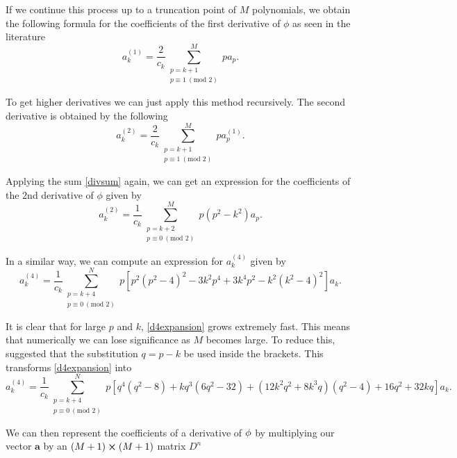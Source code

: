 If we continue this process up to a truncation point of $ M $ polynomials, we obtain the following formula for the coefficients of the first derivative of $ \phi $ as seen in the literature \citep{canuto2007spectral, orszag1971accurate} 
\begin{equation}
    a_k^{(1)} = \frac{2}{c_k} \sum^{M}_{\substack{p = k + 1 \\ p \equiv 1\ (\text{mod } 2)}} p a_p. \label{divsum}
\end{equation}

To get higher derivatives we can just apply this method recursively. The second derivative is obtained by the following 
\begin{equation}
    a_k^{(2)} = \frac{2}{c_k} \sum^{M}_{\substack{p = k + 1 \\ p \equiv 1\ (\text{mod } 2)}} p a_p^{(1)}.
\end{equation}

Applying the sum \eqref{divsum} again, we can get an expression for the coefficients of the $2$nd derivative of $ \phi$ given by
\begin{equation}
    a^{(2)}_{k} = \frac{1}{c_k} \sum^{M}_{\substack{p = k + 2 \\ p \equiv 0\ (\text{mod } 2)}} p (p^2 - k^2) a_p.
\end{equation}

In a similar way, we can compute an expression for $ a^{(4)}_k $ given by
\begin{equation}
    a^{(4)}_k = \frac{1}{c_k} \sum^N_{\substack{p = k + 4 \\ p \equiv 0\ (\text{mod } 2)}} p [p^2 (p^2 - 4)^2 - 3 k^2 p^4 + 3 k^4 p^2 - k^2 (k^2 - 4)^2] a_k.
    \label{d4expansion}
\end{equation}

It is clear that for large $ p $ and $ k $, \eqref{d4expansion} grows extremely fast. This means that numerically we can lose significance as $ M $ becomes large. To reduce this, \cite{herbert1977neutrale} suggested that the substitution $ q = p - k $ be used inside the brackets. This transforms \eqref{d4expansion} into
\begin{equation}
    a^{(4)}_k = \frac{1}{c_k} \sum^N_{\substack{p = k + 4 \\ p \equiv 0\ (\text{mod } 2)}} p [q^4 (q^2 - 8) + k q^3 (6 q^2 - 32) + (12 k^2 q^2 + 8 k^3 q)(q^2 - 4) + 16 q^2 + 32 kq] a_k.
    \label{qd4expansion}
\end{equation}

We can then represent the coefficients of a derivative of $ \phi $ by multiplying our vector $ \mathbf{a} $ by an $ (M + 1) \cross (M + 1) $ matrix $ D^n $

